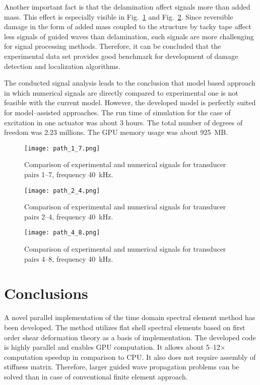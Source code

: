 \documentclass[preprint,12pt]{elsarticle}
\begin{document}
Another important fact is that the delamination affect signals more than added mass. This effect is especially visible in Fig.~\ref{fig:path1_7} and Fig.~\ref{fig:path2_4}. Since reversible damage in the form of added mass coupled to the structure by tacky tape affect less signals of guided waves than delamination, such signals are more challenging for signal processing methods. Therefore, it can be concluded that the experimental data set provides good benchmark for development of damage detection and localization algorithms.

The conducted signal analysis leads to the conclusion that model based approach in which numerical signals are directly compared to experimental one is not feasible with the current model. However, the developed model is perfectly suited for model--assisted approaches. The run time of simulation for the case of excitation in one actuator was about 3 hours. The total number of degrees of freedom was 2.23 millions. The GPU memory usage was about 925~MB.

	\begin{figure} [h!]
			\centering
			\texttt{[image: path\_1\_7.png]}	
			\caption{Comparison of experimental and numerical signals for transducer pairs 1--7, frequency 40~kHz.}
			\label{fig:path1_7}
	\end{figure}
	\begin{figure} [h!]
		\centering
		\texttt{[image: path\_2\_4.png]}	
		\caption{Comparison of experimental and numerical signals for transducer pairs 2--4, frequency 40~kHz.}
		\label{fig:path2_4}
	\end{figure}
	\begin{figure} [h!]
		\centering
		\texttt{[image: path\_4\_8.png]}	
		\caption{Comparison of experimental and numerical signals for transducer pairs 4--8, frequency 40~kHz.}
		\label{fig:path4_8}
	\end{figure}
\clearpage
	\section{Conclusions}
	A novel parallel implementation of the time domain spectral element method has been developed. The method utilizes flat shell spectral elements based on first order shear deformation theory as a basis of implementation. The developed code is highly parallel and enables GPU computation. It allows about 5--12$\times$ computation speedup in comparison to CPU. It also does not require assembly of stiffness matrix. Therefore, larger guided wave propagation problems can be solved than in case of conventional finite element approach.
	
\end{document}
